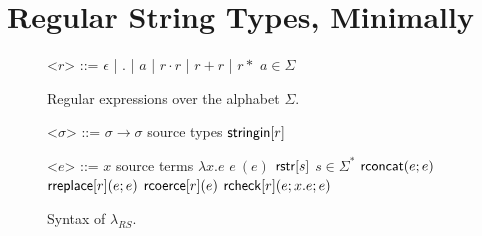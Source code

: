 \documentclass[9pt]{sig-alternate}
\theoremstyle{definition}
\newcommand{\sisubst}[3]{{\sf rreplace}[#1](#2;#3)} \newcommand{\rreplace}[3]{{\sf rreplace}[#1](#2;#3)} %
\newcommand{\rcoerce}[2]{{\sf rcoerce}[#1](#2)}
\newcommand{\sistr}[1]{{\sf rstr}[#1]}   \newcommand{\rstr}[1]{{\sf rstr}[#1]} %
\newcommand{\rcheck}[4]{ {\sf rcheck}[#1](#2;#3;#4) }
\newcommand{\strin}[1]{\sistr{#1}}
\newcommand{\rsconcat}[2]{{\sf rconcat}(#1;#2)} \newcommand{\rconcat}[2]{{\sf rconcat}(#1;#2)} %
\newcommand{\stringin}[1]{{\sf stringin}[#1]}
\begin{document}
\section{Regular String Types, Minimally}\label{calculus}
\renewcommand{\grammarlabel}[2]{#1\hfill#2}

\begin{figure}[t]
\begin{grammar}
<$r$> ::= $\epsilon$ | $.$ | $a$ | $r \cdot r$ | $r + r$ | $r*$ \hfill $a \in \Sigma$

\caption{Regular expressions over the alphabet $\Sigma$.}
\label{fig:regex}
\end{grammar}
\end{figure}

\begin{figure}[t]
\begin{grammar}

<$\sigma$> ::=  $\sigma \rightarrow \sigma$     \hfill  source types          \alt
$\stringin{r}$         

<$e$> ::= 
      $x$ \hfill source terms \alt 
      $\lambda x . e$ \alt
      $e~(e)$ \alt
      $\strin{s}$ \hfill $s \in \Sigma^{*}$ \alt
      $\rsconcat{e}{e}$ \alt
      $\sisubst{r}{e}{e}$ \alt
      $\rcoerce{r}{e}$ \alt
      $\rcheck{r}{e}{x.e}{e}$
\caption{Syntax of $\lambda_{RS}$.}\label{fig:lamrs}
\end{grammar}
\end{figure}


\newcommand{\sctx}{\Psi} %
\newcommand{\tctx}{\Theta} %

\newcommand{\ereduces}{\Downarrow}
\end{document}
